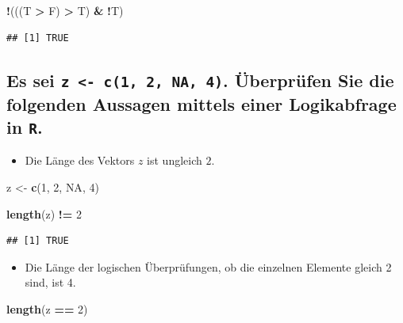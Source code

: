 \documentclass[12pt,a4paper]{article}
\newenvironment{Shaded}{\begin{snugshade}}{\end{snugshade}}
\newcommand{\ConstantTok}[1]{\textcolor[rgb]{0.56,0.35,0.01}{#1}}
\newcommand{\DecValTok}[1]{\textcolor[rgb]{0.00,0.00,0.81}{#1}}
\newcommand{\FunctionTok}[1]{\textcolor[rgb]{0.13,0.29,0.53}{\textbf{#1}}}
\newcommand{\NormalTok}[1]{#1}
\newcommand{\OtherTok}[1]{\textcolor[rgb]{0.56,0.35,0.01}{#1}}
\newcommand{\SpecialCharTok}[1]{\textcolor[rgb]{0.81,0.36,0.00}{\textbf{#1}}}
\begin{document}
\begin{Shaded}
\begin{Highlighting}[]
    \SpecialCharTok{!}\NormalTok{(((T }\SpecialCharTok{\textgreater{}}\NormalTok{ F) }\SpecialCharTok{\textgreater{}}\NormalTok{ T) }\SpecialCharTok{\&} \SpecialCharTok{!}\NormalTok{T)}
\end{Highlighting}
\end{Shaded}

\begin{verbatim}
## [1] TRUE
\end{verbatim}

\hypertarget{es-sei-z---c1-2-na-4.-uxfcberpruxfcfen-sie-die-folgenden-aussagen-mittels-einer-logikabfrage-in-r.}{%
\subsection{\texorpdfstring{Es sei
\texttt{z\ \textless{}-\ c(1,\ 2,\ NA,\ 4)}. Überprüfen Sie die
folgenden Aussagen mittels einer Logikabfrage in
\texttt{R}.}{Es sei z \textless- c(1, 2, NA, 4). Überprüfen Sie die folgenden Aussagen mittels einer Logikabfrage in R.}}\label{es-sei-z---c1-2-na-4.-uxfcberpruxfcfen-sie-die-folgenden-aussagen-mittels-einer-logikabfrage-in-r.}}

\begin{itemize}
  \item Die Länge des Vektors $z$ ist ungleich $2$.
\end{itemize}

\begin{Shaded}
\begin{Highlighting}[]
\NormalTok{    z }\OtherTok{\textless{}{-}} \FunctionTok{c}\NormalTok{(}\DecValTok{1}\NormalTok{, }\DecValTok{2}\NormalTok{, }\ConstantTok{NA}\NormalTok{, }\DecValTok{4}\NormalTok{)}
    
    \FunctionTok{length}\NormalTok{(z) }\SpecialCharTok{!=} \DecValTok{2}
\end{Highlighting}
\end{Shaded}

\begin{verbatim}
## [1] TRUE
\end{verbatim}

\begin{itemize}
  \item Die Länge der logischen Überprüfungen, ob die einzelnen Elemente gleich 2 sind, ist 4.
\end{itemize}

\begin{Shaded}
\begin{Highlighting}[]
    \FunctionTok{length}\NormalTok{(z }\SpecialCharTok{==} \DecValTok{2}\NormalTok{)}
\end{Highlighting}
\end{Shaded}
\end{document}

